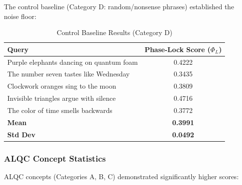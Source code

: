 The control baseline (Category D: random/nonsense phrases) established the noise floor:

\begin{table}[h]
\centering
\caption{Control Baseline Results (Category D)}
\begin{tabular}{|l|c|}
\hline
\textbf{Query} & \textbf{Phase-Lock Score ($\Phi_L$)} \\
\hline
Purple elephants dancing on quantum foam & 0.4222 \\
The number seven tastes like Wednesday & 0.3435 \\
Clockwork oranges sing to the moon & 0.3809 \\
Invisible triangles argue with silence & 0.4716 \\
The color of time smells backwards & 0.3772 \\
\hline
\textbf{Mean} & \textbf{0.3991} \\
\textbf{Std Dev} & \textbf{0.0492} \\
\hline
\end{tabular}
\end{table}

\subsubsection{ALQC Concept Statistics}

ALQC concepts (Categories A, B, C) demonstrated significantly higher scores:

